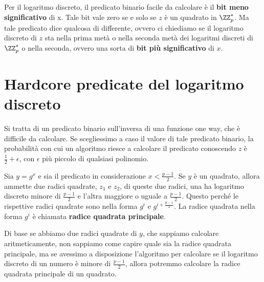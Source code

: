 Per il logaritmo discreto, il predicato binario facile da calcolare è il \textbf{bit 
meno significativo} di x. Tale bit vale zero se e solo se $z$ è un quadrato in $\ZZ_p^*$.
Ma tale predicato dice qualcosa di differente, ovvero ci chiediamo se il logaritmo discreto di 
$z$ sta nella prima metà o nella seconda metà dei logaritmi discreti di $\ZZ_p^*$ o nella seconda,
ovvero una sorta di \textbf{bit più significativo} di $x$.
\section{Hardcore predicate del logaritmo discreto}
\begin{tcolorbox}[title = Hardcore predicate]
  Si tratta di un predicato binario sull'inversa di una funzione one way, che è difficile da
  calcolare. Se scegliessimo a caso il valore di tale predicato binario, la 
  probabilità con cui un algoritmo riesce a calcolare il predicato conoscendo 
  $z$ è $\frac{1}{2} + \epsilon$, con $\epsilon$ più piccolo di qualsiasi 
  polinomio.
\end{tcolorbox}
  Sia $y = g^x$ e sia il predicato in considerazione $x < \frac{p - 1}{2}$. Se 
  $y$ è un quadrato, allora ammette due radici quadrate, $z_1$ e $z_2$,
  di queste due radici, una ha logaritmo discreto minore di $\frac{p-1}{2}$ e l'altra
  maggiore o uguale a $\frac{p-1}{2}$. Questo perché le rispettive radici quadrate
  sono nella forma $g^{i}$ e $g^{i + \frac{p-1}{2}}$. La radice quadrata 
  nella forma $g^{i}$ è chiamata \textbf{radice quadrata principale}.

  Di base se abbiamo due radici quadrate di $y$, che sappiamo 
  calcolare aritmeticamente, non sappiamo come capire quale sia
  la radice quadrata principale, ma se 
  avessimo a disposizione l'algoritmo per calcolare se il logaritmo 
  discreto di un numero è minore di $\frac{p-1}{2}$, allora potremmo
  calcolare la radice quadrata principale di un quadrato.

